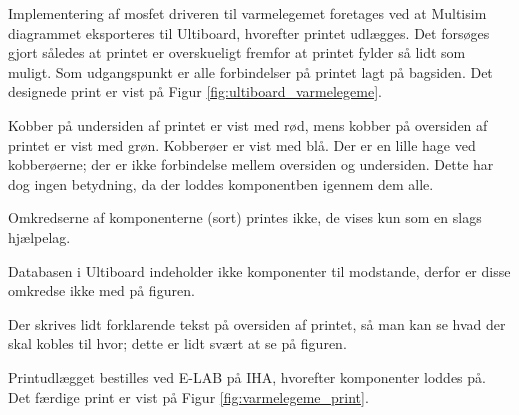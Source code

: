 Implementering af mosfet driveren til varmelegemet foretages ved at Multisim diagrammet eksporteres til Ultiboard, hvorefter printet udlægges.
Det forsøges gjort således at printet er overskueligt fremfor at printet fylder så lidt som muligt. 
Som udgangspunkt er alle forbindelser på printet lagt på bagsiden. 
Det designede print er vist på Figur \ref{fig:ultiboard_varmelegeme}. 

Kobber på undersiden af printet er vist med rød, mens kobber på oversiden af printet er vist med grøn. 
Kobberøer er vist med blå.
Der er en lille hage ved kobberøerne; der er ikke forbindelse mellem oversiden og undersiden. 
Dette har dog ingen betydning, da der loddes komponentben igennem dem alle. 

Omkredserne af komponenterne (sort) printes ikke, de vises kun som en slags hjælpelag. 

Databasen i Ultiboard indeholder ikke komponenter til modstande, derfor er disse omkredse ikke med på figuren. 

Der skrives lidt forklarende tekst på oversiden af printet, så man kan se hvad der skal kobles til hvor; dette er lidt svært at se på figuren.

\mbox{}

Printudlægget bestilles ved E-LAB på IHA, hvorefter komponenter loddes på.
Det færdige print er vist på Figur \ref{fig:varmelegeme_print}.

\clearpage

